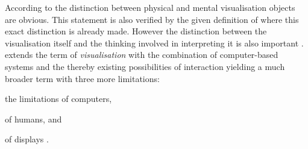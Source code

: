 According to \citeauthor{Phillips2010} the distinction between physical and mental visualisation objects are obvious. This statement is also verified by the given definition of \citeauthor{mccormick:1987} where this exact distinction is already made. However the distinction between the visualisation itself and the thinking involved in interpreting it is also important . \citeauthor{Munzner2014} extends the term of \textit{visualisation} with the combination of computer-based systems and the thereby existing possibilities of interaction yielding a much broader term with three more limitations:
\begin{enumerate*}[label={(\arabic*)}]
\item the limitations of computers,
\item of humans, and
\item of displays .
\end{enumerate*}

\cbend